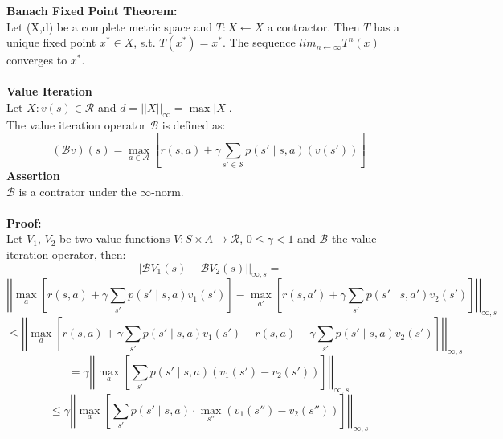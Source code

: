 \textbf{Banach Fixed Point Theorem:}\\
Let (X,d) be a complete metric space and $T:X \leftarrow X$ a contractor. 
Then $T$ has a unique fixed point $x^* \in X$, s.t. $T(x^*) = x^*$. The sequence $lim_{n \leftarrow \infty}T^n(x)$ converges to $x^*$.\\ \\

\textbf{Value Iteration}\\
Let $X : v(s) \in \mathcal{R}$ and $d = ||X||_{\infty} = \max|X|$. \\
The value iteration operator $\mathcal{B}$ is defined as:
\begin{equation}
    (\mathcal{B}v)(s) = \max_{a \in \mathcal{A}} \left[  r(s,a) +  \gamma \sum_{s' \in \mathcal{S}} p(s' \mid s,a) \left( v(s')\right) \right]
\end{equation}
\textbf{Assertion}\\

$\mathcal{B}$ is a contrator under the $\infty$-norm.\\ \\

\textbf{Proof:}\\
Let $V_1$, $V_2$ be two value functions $V : S \times A \to \mathcal{R}$, $0 \leq \gamma < 1$ and $\mathcal{B}$ the value iteration operator, then:
\begin{equation}
    \label{contractor}
||\mathcal{B}V_1(s) - \mathcal{B}V_2(s)||_{\infty, s} = 
\end{equation}
\begin{equation}
    \left|\left| \max_a \left[ r(s,a) + \gamma \sum_{s'} p(s' \mid s,a) v_1(s')\right] - \max_{a'}\left[ r(s,a') + \gamma \sum_{s'} p(s' \mid s,a') v_2(s') \right] \right|\right|_{\infty, s}
\end{equation}
\begin{equation}
    \leq \left|\left|\max_a \left[ r(s,a) + \gamma \sum_{s'} p(s' \mid s,a) v_1(s') - r(s,a) - \gamma \sum_{s'} p(s' \mid s,a) v_2(s')\right]\right|\right|_{\infty, s}
\end{equation}
\begin{equation}
= \gamma \left|\left|\max_a \left[ \sum_{s'} p(s' \mid s,a) (v_1(s') -v_2(s'))\right]\right|\right|_{\infty, s}
\end{equation}
\begin{equation}
\leq \gamma \left|\left|\max_a \left[ \sum_{s'} p(s' \mid s,a) \cdot \max_{s''} (v_1(s'') -v_2(s''))\right]\right|\right|_{\infty, s}
\end{equation}

